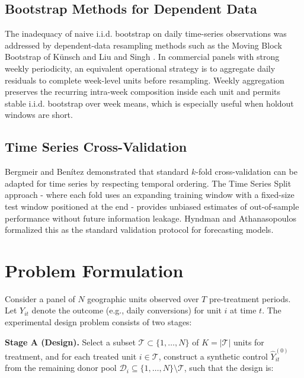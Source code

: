 \documentclass[11pt]{article}
\begin{document}
\subsection{Bootstrap Methods for Dependent Data}
The inadequacy of naive i.i.d. bootstrap on daily time-series observations was addressed by dependent-data resampling methods such as the Moving Block Bootstrap of Künsch \cite{ref10} and Liu and Singh \cite{ref11}. In commercial panels with strong weekly periodicity, an equivalent operational strategy is to aggregate daily residuals to complete week-level units before resampling. Weekly aggregation preserves the recurring intra-week composition inside each unit and permits stable i.i.d. bootstrap over week means, which is especially useful when holdout windows are short.

\subsection{Time Series Cross-Validation}
Bergmeir and Benítez \cite{ref5} demonstrated that standard $k$-fold cross-validation can be adapted for time series by respecting temporal ordering. The Time Series Split approach - where each fold uses an expanding training window with a fixed-size test window positioned at the end - provides unbiased estimates of out-of-sample performance without future information leakage. Hyndman and Athanasopoulos \cite{ref8} formalized this as the standard validation protocol for forecasting models.

\section{Problem Formulation}
Consider a panel of $N$ geographic units observed over $T$ pre-treatment periods. Let $Y_{it}$ denote the outcome (e.g., daily conversions) for unit $i$ at time $t$. The experimental design problem consists of two stages:

\textbf{Stage A (Design).} Select a subset $\mathcal{T} \subset \{ 1, \ldots, N \}$ of $K = |\mathcal{T}|$ units for treatment, and for each treated unit $i \in \mathcal{T}$, construct a synthetic control $\hat{Y}_{it}^{(0)}$ from the remaining donor pool $\mathcal{D}_i \subseteq \{ 1, \ldots, N \} \setminus \mathcal{T}$, such that the design is:
\end{document}
